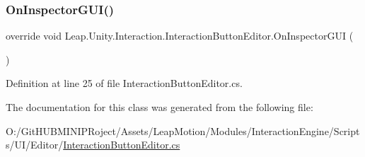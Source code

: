 \subsubsection{\texorpdfstring{OnInspectorGUI()}{OnInspectorGUI()}}
{\footnotesize\ttfamily override void Leap.\+Unity.\+Interaction.\+Interaction\+Button\+Editor.\+On\+Inspector\+G\+UI (\begin{DoxyParamCaption}{ }\end{DoxyParamCaption})}



Definition at line 25 of file Interaction\+Button\+Editor.\+cs.



The documentation for this class was generated from the following file\+:\begin{DoxyCompactItemize}
\item 
O\+:/\+Git\+H\+U\+B\+M\+I\+N\+I\+P\+Roject/\+Assets/\+Leap\+Motion/\+Modules/\+Interaction\+Engine/\+Scripts/\+U\+I/\+Editor/\mbox{\hyperlink{_interaction_button_editor_8cs}{Interaction\+Button\+Editor.\+cs}}\end{DoxyCompactItemize}
